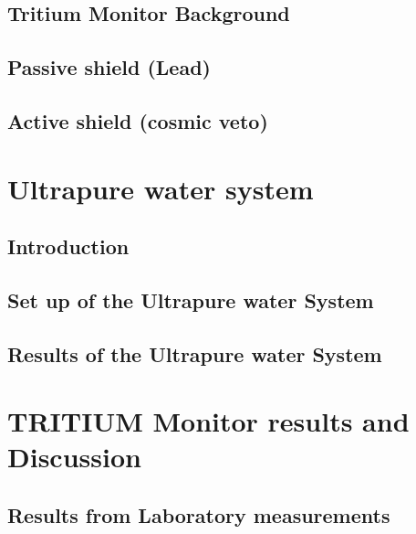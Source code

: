 \documentclass[12pt,a4paper]{book}
\begin{document}
	\section{Tritium Monitor Background}
	\newpage
		
	\section{Passive shield (Lead)}
	\newpage	
	
	\section{Active shield (cosmic veto)}
	\newpage
	
\chapter{Ultrapure water system}\label{chap:Ultrapure}
	\section{Introduction}
	\newpage
	
	\section{Set up of the Ultrapure water System}
	\newpage
	
	\section{Results of the Ultrapure water System}
	\newpage
	
\chapter{TRITIUM Monitor results and Discussion}\label{chap:Results}
	\section{Results from Laboratory measurements}
	\newpage
		
\end{document}
